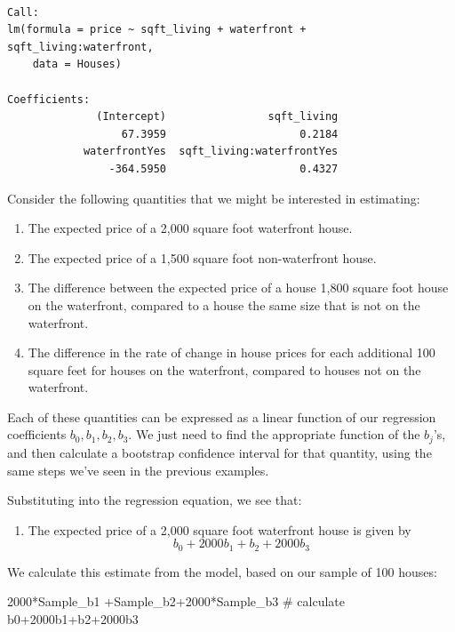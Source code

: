 \documentclass[
  letterpaper,
  DIV=11,
  numbers=noendperiod]{scrreprt}
\newenvironment{Shaded}{\begin{snugshade}}{\end{snugshade}}
\newcommand{\CommentTok}[1]{\textcolor[rgb]{0.37,0.37,0.37}{#1}}
\newcommand{\DecValTok}[1]{\textcolor[rgb]{0.68,0.00,0.00}{#1}}
\newcommand{\NormalTok}[1]{\textcolor[rgb]{0.00,0.23,0.31}{#1}}
\newcommand{\SpecialCharTok}[1]{\textcolor[rgb]{0.37,0.37,0.37}{#1}}
\providecommand{\tightlist}{%
  \setlength{\itemsep}{0pt}\setlength{\parskip}{0pt}}\usepackage{longtable,booktabs,array}
\begin{document}
\begin{verbatim}

Call:
lm(formula = price ~ sqft_living + waterfront + sqft_living:waterfront, 
    data = Houses)

Coefficients:
              (Intercept)                sqft_living  
                  67.3959                     0.2184  
            waterfrontYes  sqft_living:waterfrontYes  
                -364.5950                     0.4327  
\end{verbatim}

Consider the following quantities that we might be interested in
estimating:

\begin{enumerate}
\def\labelenumi{\arabic{enumi}.}
\tightlist
\item
  The expected price of a 2,000 square foot waterfront house.\\
\item
  The expected price of a 1,500 square foot non-waterfront house.\\
\item
  The difference between the expected price of a house 1,800 square foot
  house on the waterfront, compared to a house the same size that is not
  on the waterfront.\\
\item
  The difference in the rate of change in house prices for each
  additional 100 square feet for houses on the waterfront, compared to
  houses not on the waterfront.
\end{enumerate}

Each of these quantities can be expressed as a linear function of our
regression coefficients \(b_0, b_1, b_2, b_3\). We just need to find the
appropriate function of the \(b_j\)'s, and then calculate a bootstrap
confidence interval for that quantity, using the same steps we've seen
in the previous examples.

Substituting into the regression equation, we see that:

\begin{enumerate}
\def\labelenumi{\arabic{enumi}.}
\tightlist
\item
  The expected price of a 2,000 square foot waterfront house is given by
  \[b_0 + 2000b_1 + b_2 + 2000b_3\]
\end{enumerate}

We calculate this estimate from the model, based on our sample of 100
houses:

\begin{Shaded}
\begin{Highlighting}[]
\DecValTok{2000}\SpecialCharTok{*}\NormalTok{Sample\_b1 }\SpecialCharTok{+}\NormalTok{Sample\_b2}\SpecialCharTok{+}\DecValTok{2000}\SpecialCharTok{*}\NormalTok{Sample\_b3 }\CommentTok{\# calculate b0+2000b1+b2+2000b3}
\end{Highlighting}
\end{Shaded}
\end{document}
